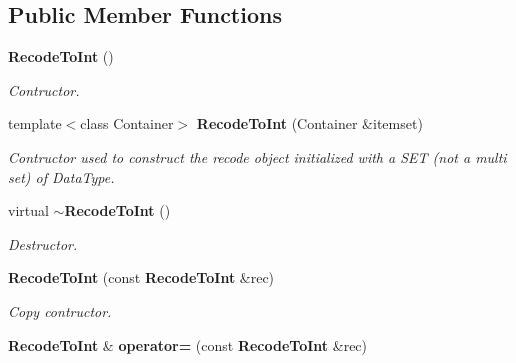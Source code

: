 \subsection*{Public Member Functions}
\begin{CompactItemize}
\item 
{\bf Recode\-To\-Int} ()\label{class_recode_to_int_7afccf5cc723177c720d62d7eedc5414}

\begin{CompactList}\small\item\em Contructor. \item\end{CompactList}\item 
template$<$class Container$>$ {\bf Recode\-To\-Int} (Container \&itemset)
\begin{CompactList}\small\item\em Contructor used to construct the recode object initialized with a SET (not a multi set) of Data\-Type. \item\end{CompactList}\item 
virtual {\bf $\sim$Recode\-To\-Int} ()\label{class_recode_to_int_264d862332a6695baeeb1625d22b8434}

\begin{CompactList}\small\item\em Destructor. \item\end{CompactList}\item 
{\bf Recode\-To\-Int} (const {\bf Recode\-To\-Int} \&rec)\label{class_recode_to_int_8ae90856c152323463a232005e5fb878}

\begin{CompactList}\small\item\em Copy contructor. \item\end{CompactList}\item 
{\bf Recode\-To\-Int} \& {\bf operator=} (const {\bf Recode\-To\-Int} \&rec)\label{class_recode_to_int_40bf1ee6b8a5e79af7a688b3b59eb009}


\end{CompactItemize}

